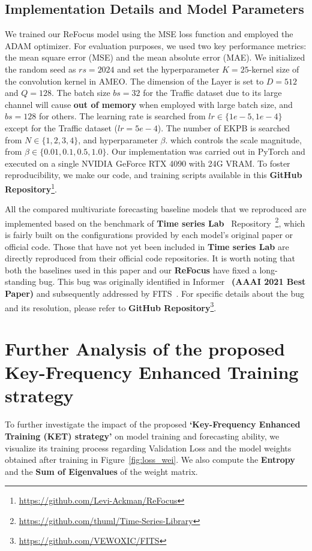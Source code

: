 \subsection{Implementation Details and Model Parameters}
\label{app:implementation}
We trained our ReFocus model using the MSE loss function and employed the ADAM optimizer. For evaluation purposes, we used two key performance metrics: the mean square error (MSE) and the mean absolute error (MAE). We initialized the random seed as $rs = 2024$ and set the hyperparameter $K = 25$-kernel size of the convolution kernel in AMEO. The dimension of the Layer is set to $D =512$ and $Q=128$. The batch size $bs=32$ for the Traffic dataset due to its large channel will cause \textbf{out of memory} when employed with large batch size, and $bs=128$ for others. The learning rate is searched from $lr \in \{1e-5,1e-4\}$ except for the Traffic dataset ($lr=5e-4$). The number of EKPB is searched from $N \in \{1,2,3,4\}$, and hyperparameter $\beta$. which controls the scale magnitude, from $\beta \in \{ 0.01,0.1,0.5,1.0\}$. Our implementation was carried out in PyTorch and executed on a single NVIDIA GeForce RTX 4090 with 24G VRAM. To foster reproducibility, we make our code, and training scripts available in this \textbf{GitHub Repository}\footnote{\url{https://github.com/Levi-Ackman/ReFocus}}. 

All the compared multivariate forecasting baseline models that we reproduced are implemented based on the benchmark of \textbf{Time series Lab}~\citep{Wangtslb2024} Repository~\footnote{\url{https://github.com/thuml/Time-Series-Library}}, which is fairly built on the configurations provided by each model's original paper or official code. Those that have not yet been included in \textbf{Time series Lab} are directly reproduced from their official code repositories. It is worth noting that both the baselines used in this paper and our \textbf{ReFocus} have fixed a long-standing bug. This bug was originally identified in Informer~\citep{Zhou2020informer} \textbf{(AAAI 2021 Best Paper)} and subsequently addressed by FITS~\citep{xu2024fits}. For specific details about the bug and its resolution, please refer to \textbf{GitHub Repository}\footnote{\url{https://github.com/VEWOXIC/FITS}}.

\section{Further Analysis of the proposed Key-Frequency Enhanced Training strategy}
\label{app:further ket}
To further investigate the impact of the proposed \textbf{`Key-Frequency Enhanced Training (KET) strategy'} on model training and forecasting ability, we visualize its training process regarding Validation Loss and the model weights obtained after training in Figure~\ref{fig:loss_wei}. We also compute the \textbf{Entropy} and the \textbf{Sum of Eigenvalues} of the weight matrix. 

